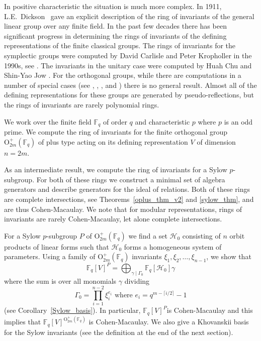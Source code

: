 \documentclass{amsart}
\newcommand{\field}{\mathbb{F}}
\newcommand{\orthp}[2]{{{\text{O}^{+}_{{#1}}(\field_{#2})}}}
\newcommand{\HH}{\mathcal{H}}
\begin{document}
In positive characteristic the situation is much more complex.
In 1911, L.E.~Dickson~\cite{dickson-fundsystinvagene:11} gave an explicit description of the ring of 
invariants of the general linear group over any finite field.  In the past few decades
there has been significant progress in determining the rings of invariants of the defining 
representations of the finite classical groups.  
The rings of invariants for the symplectic groups were computed by David Carlisle and Peter Kropholler in the 1990s, see 
\cite[\S 8.3]{benson-polyinvafinigrou:93}.
The invariants in the unitary case were computed by 
Huah Chu and Shin-Yao Jow \cite{Chu+Jow-polyinvunitary:06}.
For the orthogonal groups, while there are computations in a number of special cases (see 
\cite{chiang+hung-invorth:93},
\cite{chu-polyinvorth:01},
\cite{cohen-ratfuncortho:90},
\cite{Kropholler+Rajaei+Segal:05} and
\cite{smith-ringinvorth:99}
)
there is no general result.  
Almost all of the defining representations for these groups are generated by pseudo-reflections, but the rings of invariants are rarely polynomial rings. 

We work over the finite field $\field_q$ of order $q$ and characteristic $p$ where $p$ is an odd prime.
We compute the ring of invariants for the
finite orthogonal group $\orthp{2m}{q}$ of plus type
acting on its defining representation $V$ of dimension $n=2m$.  

As an intermediate result, we compute the ring of invariants for 
a Sylow $p$-subgroup. 
For both of these rings we construct a minimal set of algebra generators and describe
generators for the ideal of relations. 
Both of these rings are complete intersections, see Theorems~\ref{oplus_thm_v2} and \ref{sylow_thm}, and are thus Cohen-Macaulay.  We note that for modular 
representations, rings of invariants are rarely Cohen-Macaulay, let alone 
complete intersections.

  For a Sylow $p$-subgroup $P$ of $\orthp{2m}{q}$ we find a set $\HH_0$ consisting
of $n$ orbit products of linear forms such that 
$\HH_0$ forms a homogeneous system of parameters.  Using a family of 
$\orthp{2m}{q}$ invariants $\xi_1,\xi_2,\dots,\xi_{n-1}$, we show that
$$\field_{q}[V]^{P} = \bigoplus_{\gamma\mid\Gamma_0} \field_{q}[\HH_0]\gamma$$ 
where the sum is over all monomials $\gamma$ dividing 
$$\Gamma_0=\prod_{i=1}^{n-2} \xi_{i}^{e_i} \text{ where } e_i = q^{m-\lceil i/2\rceil}-1$$
(see Corollary~\ref{Sylow_basis}).
In particular, $\field_{q}[V]^{P}$is Cohen-Macaulay and this implies that
$\field_{q}[V]^{\orthp{2m}{q}}$ is Cohen-Macaulay.
We also give a Khovanskii basis for the Sylow invariants
(see the definition at the end of the next section).
\end{document}
